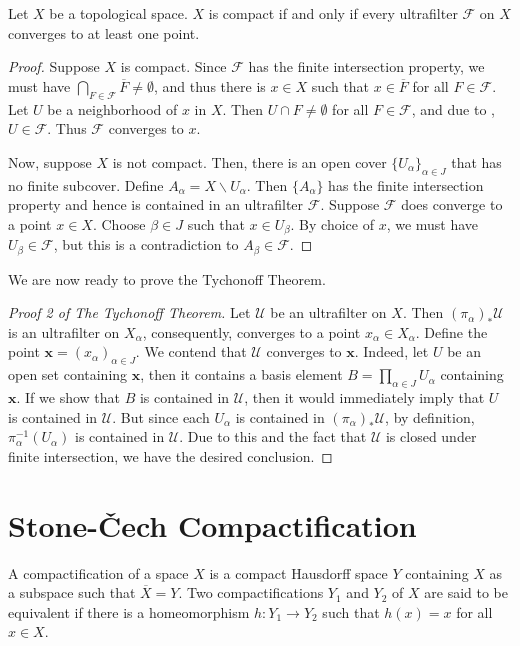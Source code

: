 \begin{theorem}
    Let $X$ be a topological space. $X$ is compact if and only if every ultrafilter $\mathcal F$ on $X$ converges to at least one point.
\end{theorem}
\begin{proof}
    Suppose $X$ is compact. Since $\mathcal F$ has the finite intersection property, we must have $\bigcap\limits_{F\in\mathcal F}\overline F\ne\emptyset$, and thus there is $x\in X$ such that $x\in\overline F$ for all $F\in\mathcal F$. Let $U$ be a neighborhood of $x$ in $X$. Then $U\cap F\ne\emptyset$ for all $F\in\mathcal F$, and due to , $U\in\mathcal F$. Thus $\mathcal F$ converges to $x$.

    Now, suppose $X$ is not compact. Then, there is an open cover $\{U_\alpha\}_{\alpha\in J}$ that has no finite subcover. Define $A_\alpha = X\backslash U_\alpha$. Then $\{A_\alpha\}$ has the finite intersection property and hence is contained in an ultrafilter $\mathcal F$. Suppose $\mathcal F$ does converge to a point $x\in X$. Choose $\beta\in J$ such that $x\in U_\beta$. By choice of $x$, we must have $U_\beta\in\mathcal F$, but this is a contradiction to $A_\beta\in\mathcal F$.
\end{proof}

We are now ready to prove the Tychonoff Theorem. 

\begin{proof}[Proof 2 of The Tychonoff Theorem]
    Let $\mathscr U$ be an ultrafilter on $X$. Then $(\pi_\alpha)_*\mathscr U$ is an ultrafilter on $X_\alpha$, consequently, converges to a point $x_\alpha\in X_\alpha$. Define the point $\mathbf x = (x_\alpha)_{\alpha\in J}$. We contend that $\mathscr U$ converges to $\mathbf x$. Indeed, let $U$ be an open set containing $\mathbf x$, then it contains a basis element $B = \prod_{\alpha\in J} U_\alpha$ containing $\mathbf x$. If we show that $B$ is contained in $\mathscr U$, then it would immediately imply that $U$ is contained in $\mathscr U$. But since each $U_\alpha$ is contained in $(\pi_\alpha)_*\mathscr U$, by definition, $\pi_\alpha^{-1}(U_\alpha)$ is contained in $\mathscr U$. Due to this and the fact that $\mathscr U$ is closed under finite intersection, we have the desired conclusion.
\end{proof}

\section{Stone-\v{C}ech Compactification}
\begin{definition}[Compactification]
    A compactification of a space $X$ is a compact Hausdorff space $Y$ containing $X$ as a subspace such that $\overline X = Y$. Two compactifications $Y_1$ and $Y_2$ of $X$ are said to be equivalent if there is a homeomorphism $h: Y_1\to Y_2$ such that $h(x) = x$ for all $x\in X$.
\end{definition}

